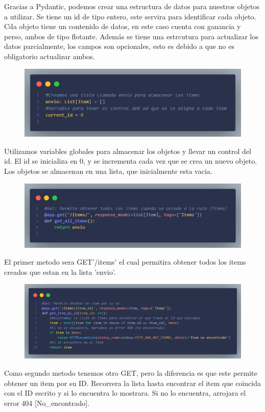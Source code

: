 \documentclass[12pt]{article}
\begin{document}
Gracias a Pydantic, podemos crear una estructura de datos para nuestros objetos a utilizar.
Se tiene un id de tipo entero, este servira para identificar cada objeto.
Cda objeto tiene un contenido de datos, en este caso cuenta con ganancia y perso, ambos de tipo flotante.
Además se tiene una estrcutura para actualizar los datos parcialmente, los campos son opcionales, esto es debido a que no es obligatorio actualizar ambos.

\begin{figure}[H]
    \centering
    \includegraphics[width=1\textwidth]{Imagenes/Captura4_variablesGlobales.png}
\end{figure}
Utilizamos variables globales para almacenar los objetos y llevar un control del id.
El id se inicializa en 0, y se incrementa cada vez que se crea un nuevo objeto.
Los objetos se almacenan en una lista, que inicialmente esta vacia.

\begin{figure}[H]
    \centering
    \includegraphics[width=1\textwidth]{Imagenes/Captura5_getAll.png}
\end{figure}
El primer metodo sera GET{'/items'} el cual permitira obtener todos los items creados que estan en la lista 'envio'.

\begin{figure}[H]
    \centering
    \includegraphics[width=1\textwidth]{Imagenes/Captura6_getindividual.png}
\end{figure}
Como segundo metodo tenemos otro GET, pero la diferencia es que este permite obtener un item por su ID.
Recorrera la lista hasta encontrar el item que coincida con el ID escrito y si lo encuentra lo mostrara.
Si no lo encuentra, arrojara el error 404 [No\_encontrado].
\end{document}
